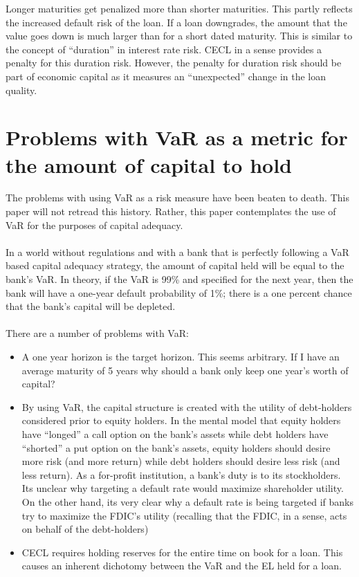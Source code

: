 \documentclass{article}
\begin{document}
Longer maturities get penalized more than shorter maturities.  This partly reflects the increased default risk of the loan.  If a loan downgrades, the amount that the value goes down is much larger than for a short dated maturity.  This is similar to the concept of ``duration'' in interest rate risk.  CECL in a sense provides a penalty for this duration risk.  However, the penalty for duration risk should be part of economic capital as it measures an ``unexpected'' change in the loan quality.

\section{Problems with VaR as a metric for the amount of capital to hold}

The problems with using VaR as a risk measure have been beaten to death.  This paper will not retread this history.  Rather, this paper contemplates the use of VaR for the purposes of capital adequacy.  
\\
\\
In a world without regulations and with a bank that is perfectly following a VaR based capital adequacy strategy, the amount of capital held will be equal to the bank's VaR.  In theory, if the VaR is 99\% and specified for the next year, then the bank will have a one-year default probability of 1\%; there is a one percent chance that the bank's capital will be depleted.  
\\
\\
There are a number of problems with VaR:
\begin{itemize}
\item A one year horizon is the target horizon.  This seems arbitrary.  If I have an average maturity of 5 years why should a bank only keep one year's worth of capital?  
\item By using VaR, the capital structure is created with the utility of debt-holders considered prior to equity holders.  In the mental model that equity holders have ``longed'' a call option on the bank's assets while debt holders have ``shorted'' a put option on the bank's assets, equity holders should desire more risk (and more return) while debt holders should desire less risk (and less return).  As a for-profit institution, a bank's duty is to its stockholders.  Its unclear why targeting a default rate would maximize shareholder utility. On the other hand, its very clear why a default rate is being targeted if banks try to maximize the FDIC's utility (recalling that the FDIC, in a sense, acts on behalf of the debt-holders)
\item CECL requires holding reserves for the entire time on book for a loan.  This causes an inherent dichotomy between the VaR and the EL held for a loan.
\end{itemize}
\end{document}
